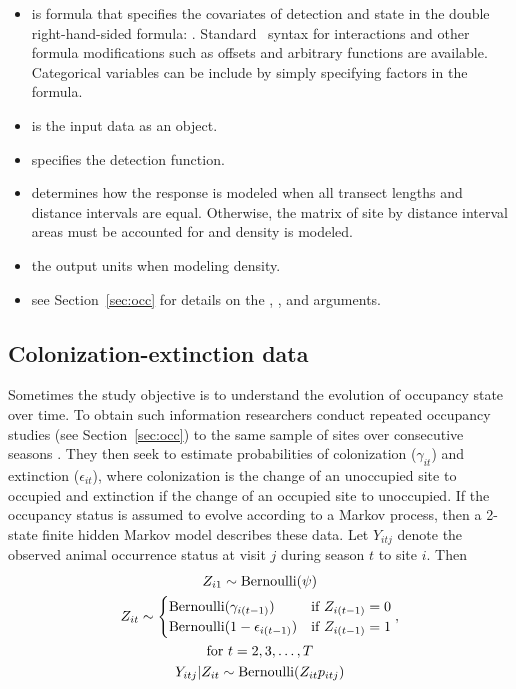 \documentclass[article,shortnames]{jss}
\DeclareMathOperator{\Bern}{Bernoulli}
\newcommand{\rlang}{\proglang{R}}
\begin{document}
\begin{itemize}
    \item {} is formula that specifies the covariates of
        detection and state in the double right-hand-sided formula: .  Standard \rlang\ syntax for
        interactions and other formula modifications such as offsets and
        arbitrary functions are available.  Categorical variables can be
        include by simply specifying factors in the formula.
    \item {} is the input data as an
         object.
    \item {} specifies the detection function.
    \item {} determines how the response is modeled when all
        transect lengths and distance intervals are equal. Otherwise, 
        the matrix of site by distance interval areas must be accounted for
        and density is modeled.
    \item {} the output units when modeling density.
    \item see Section~\ref{sec:occ} for details on the ,
      , and  arguments.
  \end{itemize}
  
  \subsection{Colonization-extinction data}

Sometimes the study objective is to understand the evolution of
occupancy state over time.  To obtain such information %
researchers conduct repeated occupancy
studies (see Section~\ref{sec:occ}) to the same sample of sites over
consecutive seasons \citep{MacKenzie2003}.  They then seek to estimate
probabilities of colonization ($\gamma_{it}$) and extinction
($\epsilon_{it}$), where colonization is the change of an unoccupied
site to occupied and extinction if the change of an occupied site to
unoccupied.  If the occupancy status is assumed to evolve according to
a Markov process, then a 2-state finite hidden Markov model describes
these data.  Let $Y_{itj}$ denote the observed animal occurrence
status at visit $j$ during season $t$ to site $i$.  Then
\begin{gather}
  Z_{i1} \sim \Bern(\psi) \\
  Z_{it} \sim
  \begin{cases}
    \Bern(\gamma_{i(t-1)}) & \text{if $Z_{i(t-1)} = 0$} \\
    \Bern(1-\epsilon_{i(t-1)}) & \text{if $Z_{i(t-1)} = 1$}
  \end{cases}, \\
  \text{for $t=2,3,\dots,T$} \notag \\
  Y_{itj} | Z_{it} \sim \Bern(Z_{it} p_{itj})
\end{gather}
\end{document}
